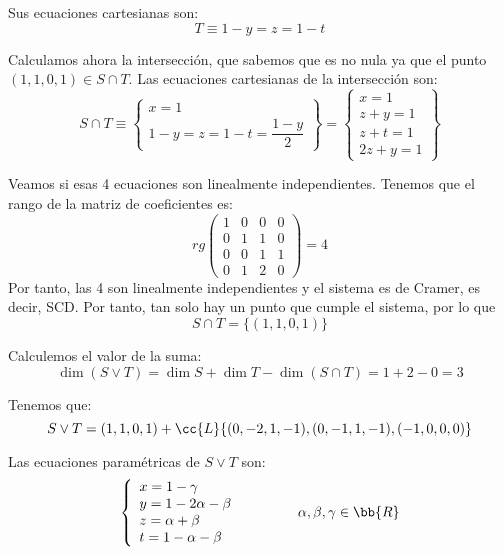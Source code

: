 \begin{ejercicio}
    Sus ecuaciones cartesianas son:
    \begin{equation*}
        T\equiv 1-y = z = 1-t
    \end{equation*}

    Calculamos ahora la intersección, que sabemos que es no nula ya que el punto $(1,1,0,1)\in S\cap T$. Las ecuaciones cartesianas de la intersección son:
    \begin{equation*}
        S\cap T\equiv \left\{
            \begin{array}{l}
                x=1 \\
                1-y=z=1-t = \dfrac{1-y}{2}
            \end{array}
        \right\}
        = \left\{
            \begin{array}{l}
                x=1 \\
               z+y=1\\
               z+t=1 \\
               2z+y=1\end{array}
        \right\}
    \end{equation*}

    Veamos si esas 4 ecuaciones son linealmente independientes. Tenemos que el rango de la matriz de coeficientes es:
    \begin{equation*}
        rg\left(\begin{array}{cccc}
            1 & 0 & 0 & 0 \\
            0 & 1 & 1 & 0 \\
            0 & 0 & 1 & 1 \\
            0 & 1 & 2 & 0
        \end{array}\right) = 4
    \end{equation*}
    Por tanto, las 4 son linealmente independientes y el sistema es de Cramer, es decir, SCD. Por tanto, tan solo hay un punto que cumple el sistema, por lo que
    $$S\cap T = \{(1,1,0,1)\}$$

    Calculemos el valor de la suma:
    \begin{equation*}
        \dim (S\vee T) = \dim S + \dim T -\dim(S\cap T) = 1+2-0=3
    \end{equation*}

    Tenemos que:
    \begin{equation*}
        S\vee T = (1,1,0,1) + \cc{L}\{(0, -2, 1, -1), (0,-1,1,-1), (-1,0,0,0)\}
    \end{equation*}

    Las ecuaciones paramétricas de $S\vee T$ son:
    \begin{equation*}
        \left\{
            \begin{array}{l}
                x = 1 -\gamma \\
                y = 1-2\alpha-\beta\\
                z = \alpha+\beta \\
                t = 1-\alpha-\beta
            \end{array}
        \right. \qquad \qquad \alpha,\beta,\gamma\in \bb{R}
    \end{equation*}


\end{ejercicio}

